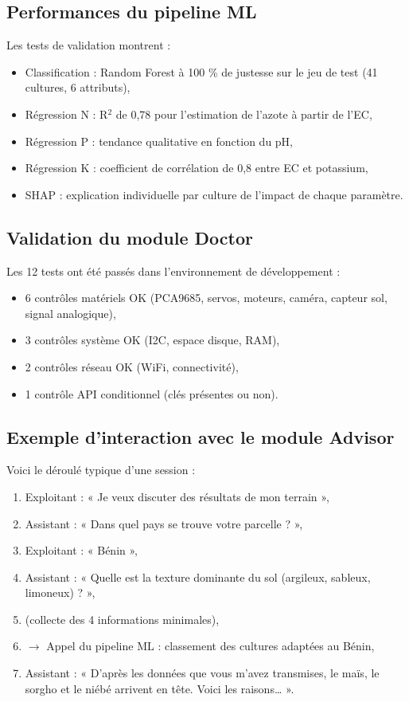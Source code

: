\documentclass[a4paper,12pt,openany,titlepage]{scrartcl}
\begin{document}
\subsection{Performances du pipeline ML}
Les tests de validation montrent :
\begin{itemize}[nosep]
    \item Classification : Random Forest à 100 \% de justesse sur le jeu de test (41 cultures, 6 attributs),
    \item Régression N : R$^2$ de 0,78 pour l’estimation de l’azote à partir de l’EC,
    \item Régression P : tendance qualitative en fonction du pH,
    \item Régression K : coefficient de corrélation de 0,8 entre EC et potassium,
    \item SHAP : explication individuelle par culture de l’impact de chaque paramètre.
\end{itemize}

\subsection{Validation du module Doctor}
Les 12 tests ont été passés dans l’environnement de développement :
\begin{itemize}[nosep]
    \item 6 contrôles matériels OK (PCA9685, servos, moteurs, caméra, capteur sol, signal analogique),
    \item 3 contrôles système OK (I2C, espace disque, RAM),
    \item 2 contrôles réseau OK (WiFi, connectivité),
    \item 1 contrôle API conditionnel (clés présentes ou non).
\end{itemize}

\subsection{Exemple d’interaction avec le module Advisor}
Voici le déroulé typique d’une session :
\begin{enumerate}[nosep]
    \item Exploitant : « Je veux discuter des résultats de mon terrain »,
    \item Assistant : « Dans quel pays se trouve votre parcelle ? »,
    \item Exploitant : « Bénin »,
    \item Assistant : « Quelle est la texture dominante du sol (argileux, sableux, limoneux) ? »,
    \item (collecte des 4 informations minimales),
    \item $\rightarrow$ Appel du pipeline ML : classement des cultures adaptées au Bénin,
    \item Assistant : « D’après les données que vous m’avez transmises, le maïs, le sorgho et le niébé arrivent en tête. Voici les raisons… ».
\end{enumerate}
\end{document}
